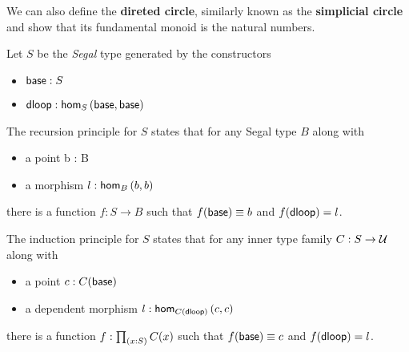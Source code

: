 \documentclass[main.tex]{subfiles}
\begin{document}
We can also define the \textbf{direted circle}, similarly known as the \textbf{simplicial circle} and show that its fundamental
monoid is the natural numbers.

Let $S$ be the \textit{Segal} type generated by the constructors
\begin{itemize}
    \item $\ba : S$
    \item $\dl : \ho[S]{\ba}{\ba}$
\end{itemize}
The recursion principle for $S$ states that for any Segal type $B$ along with
\begin{itemize}
    \item a point b : B
    \item a morphism $l : \ho[B]{b}{b}$
\end{itemize}
there is a function $f : S \to B$ such that $f(\ba) \equiv b$ and $f(\dl) = l$.

The induction principle for $S$ states that for any inner type family $C : S \to \U$ along with 
\begin{itemize}
    \item a point $c : C(\ba)$
    \item a dependent morphism $l : \ho[C(\dl)]{c}{c}$
\end{itemize}
there is a function $f : \prd{x:S}C(x)$ such that $f(\ba) \equiv c$ and $f(\dl) = l$.
\end{document}
